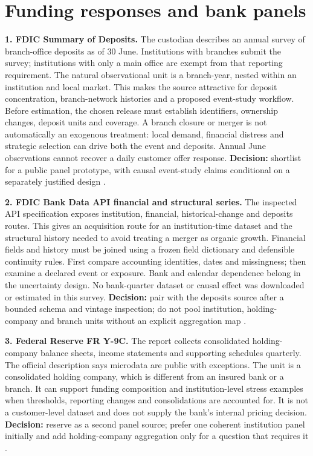 \hypertarget{funding-responses-and-bank-panels}{%
\section{Funding responses and bank
panels}\label{funding-responses-and-bank-panels}}

\textbf{1. FDIC Summary of Deposits.} The custodian describes an annual
survey of branch-office deposits as of 30 June. Institutions with
branches submit the survey; institutions with only a main office are
exempt from that reporting requirement. The natural observational unit
is a branch-year, nested within an institution and local market. This
makes the source attractive for deposit concentration, branch-network
histories and a proposed event-study workflow. Before estimation, the
chosen release must establish identifiers, ownership changes, deposit
units and coverage. A branch closure or merger is not automatically an
exogenous treatment: local demand, financial distress and strategic
selection can drive both the event and deposits. Annual June
observations cannot recover a daily customer offer response.
\textbf{Decision:} shortlist for a public panel prototype, with causal
event-study claims conditional on a separately justified design
\citep{pd15_fdic_sod}.

\textbf{2. FDIC Bank Data API financial and structural series.} The
inspected API specification exposes institution, financial,
historical-change and deposits routes. This gives an acquisition route
for an institution-time dataset and the structural history needed to
avoid treating a merger as organic growth. Financial fields and history
must be joined using a frozen field dictionary and defensible continuity
rules. First compare accounting identities, dates and missingness; then
examine a declared event or exposure. Bank and calendar dependence
belong in the uncertainty design. No bank-quarter dataset or causal
effect was downloaded or estimated in this survey. \textbf{Decision:}
pair with the deposits source after a bounded schema and vintage
inspection; do not pool institution, holding-company and branch units
without an explicit aggregation map \citep{pd15_fdic_api_spec}.

\textbf{3. Federal Reserve FR Y-9C.} The report collects consolidated
holding-company balance sheets, income statements and supporting
schedules quarterly. The official description says microdata are public
with exceptions. The unit is a consolidated holding company, which is
different from an insured bank or a branch. It can support funding
composition and institution-level stress examples when thresholds,
reporting changes and consolidations are accounted for. It is not a
customer-level dataset and does not supply the bank's internal pricing
decision. \textbf{Decision:} reserve as a second panel source; prefer
one coherent institution panel initially and add holding-company
aggregation only for a question that requires it \citep{pd15_y9c}.

